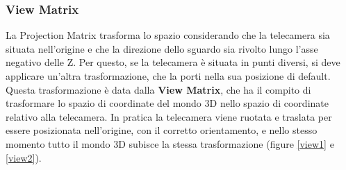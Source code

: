 %
%

\subsubsection{View Matrix}
La Projection Matrix trasforma lo spazio considerando che la telecamera sia situata nell'origine e che la direzione dello sguardo sia rivolto lungo l'asse negativo delle Z. Per questo, se la telecamera è situata in punti diversi, si deve applicare un'altra trasformazione, che la porti nella sua posizione di default. Questa trasformazione è data dalla \textbf{View Matrix}, che ha il compito di trasformare lo spazio di coordinate del mondo 3D nello spazio di coordinate relativo alla telecamera. In pratica la telecamera viene ruotata e traslata per essere posizionata nell'origine, con il corretto orientamento, e nello stesso momento tutto il mondo 3D subisce la stessa trasformazione (figure \ref{view1} e \ref{view2}).

